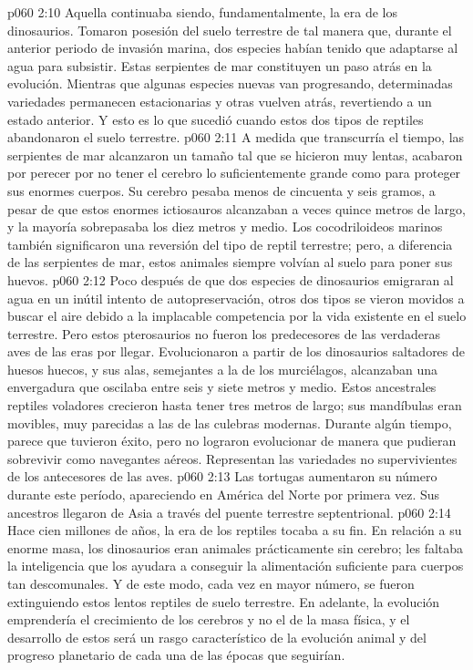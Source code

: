\vs p060 2:10 Aquella continuaba siendo, fundamentalmente, la era de los dinosaurios. Tomaron posesión del suelo terrestre de tal manera que, durante el anterior periodo de invasión marina, dos especies habían tenido que adaptarse al agua para subsistir. Estas serpientes de mar constituyen un paso atrás en la evolución. Mientras que algunas especies nuevas van progresando, determinadas variedades permanecen estacionarias y otras vuelven atrás, revertiendo a un estado anterior. Y esto es lo que sucedió cuando estos dos tipos de reptiles abandonaron el suelo terrestre.
\vs p060 2:11 A medida que transcurría el tiempo, las serpientes de mar alcanzaron un tamaño tal que se hicieron muy lentas, acabaron por perecer por no tener el cerebro lo suficientemente grande como para proteger sus enormes cuerpos. Su cerebro pesaba menos de cincuenta y seis gramos, a pesar de que estos enormes ictiosauros alcanzaban a veces quince metros de largo, y la mayoría sobrepasaba los diez metros y medio. Los cocodriloideos marinos también significaron una reversión del tipo de reptil terrestre; pero, a diferencia de las serpientes de mar, estos animales siempre volvían al suelo para poner sus huevos.
\vs p060 2:12 Poco después de que dos especies de dinosaurios emigraran al agua en un inútil intento de autopreservación, otros dos tipos se vieron movidos a buscar el aire debido a la implacable competencia por la vida existente en el suelo terrestre. Pero estos pterosaurios no fueron los predecesores de las verdaderas aves de las eras por llegar. Evolucionaron a partir de los dinosaurios saltadores de huesos huecos, y sus alas, semejantes a la de los murciélagos, alcanzaban una envergadura que oscilaba entre seis y siete metros y medio. Estos ancestrales reptiles voladores crecieron hasta tener tres metros de largo; sus mandíbulas eran movibles, muy parecidas a las de las culebras modernas. Durante algún tiempo, parece que tuvieron éxito, pero no lograron evolucionar de manera que pudieran sobrevivir como navegantes aéreos. Representan las variedades no supervivientes de los antecesores de las aves.
\vs p060 2:13 Las tortugas aumentaron su número durante este período, apareciendo en América del Norte por primera vez. Sus ancestros llegaron de Asia a través del puente terrestre septentrional.
\vs p060 2:14 \pc Hace cien millones de años, la era de los reptiles tocaba a su fin. En relación a su enorme masa, los dinosaurios eran animales prácticamente sin cerebro; les faltaba la inteligencia que los ayudara a conseguir la alimentación suficiente para cuerpos tan descomunales. Y de este modo, cada vez en mayor número, se fueron extinguiendo estos lentos reptiles de suelo terrestre. En adelante, la evolución emprendería el crecimiento de los cerebros y no el de la masa física, y el desarrollo de estos será un rasgo característico de la evolución animal y del progreso planetario de cada una de las épocas que seguirían.
